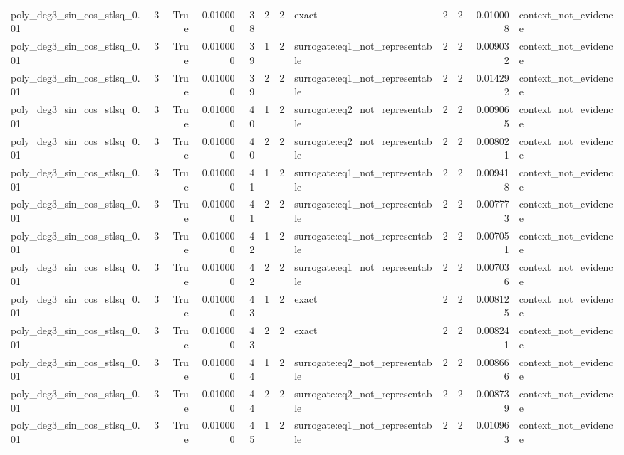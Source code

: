 \begin{tabular}{lrrrrrrlrrrl}
poly\_deg3\_sin\_cos\_stlsq\_0.01 & 3 & True & 0.010000 & 38 & 2 & 2 & exact & 2 & 2 & 0.010008 & context\_not\_evidence \\
poly\_deg3\_sin\_cos\_stlsq\_0.01 & 3 & True & 0.010000 & 39 & 1 & 2 & surrogate:eq1\_not\_representable & 2 & 2 & 0.009032 & context\_not\_evidence \\
poly\_deg3\_sin\_cos\_stlsq\_0.01 & 3 & True & 0.010000 & 39 & 2 & 2 & surrogate:eq1\_not\_representable & 2 & 2 & 0.014292 & context\_not\_evidence \\
poly\_deg3\_sin\_cos\_stlsq\_0.01 & 3 & True & 0.010000 & 40 & 1 & 2 & surrogate:eq2\_not\_representable & 2 & 2 & 0.009065 & context\_not\_evidence \\
poly\_deg3\_sin\_cos\_stlsq\_0.01 & 3 & True & 0.010000 & 40 & 2 & 2 & surrogate:eq2\_not\_representable & 2 & 2 & 0.008021 & context\_not\_evidence \\
poly\_deg3\_sin\_cos\_stlsq\_0.01 & 3 & True & 0.010000 & 41 & 1 & 2 & surrogate:eq1\_not\_representable & 2 & 2 & 0.009418 & context\_not\_evidence \\
poly\_deg3\_sin\_cos\_stlsq\_0.01 & 3 & True & 0.010000 & 41 & 2 & 2 & surrogate:eq1\_not\_representable & 2 & 2 & 0.007773 & context\_not\_evidence \\
poly\_deg3\_sin\_cos\_stlsq\_0.01 & 3 & True & 0.010000 & 42 & 1 & 2 & surrogate:eq1\_not\_representable & 2 & 2 & 0.007051 & context\_not\_evidence \\
poly\_deg3\_sin\_cos\_stlsq\_0.01 & 3 & True & 0.010000 & 42 & 2 & 2 & surrogate:eq1\_not\_representable & 2 & 2 & 0.007036 & context\_not\_evidence \\
poly\_deg3\_sin\_cos\_stlsq\_0.01 & 3 & True & 0.010000 & 43 & 1 & 2 & exact & 2 & 2 & 0.008125 & context\_not\_evidence \\
poly\_deg3\_sin\_cos\_stlsq\_0.01 & 3 & True & 0.010000 & 43 & 2 & 2 & exact & 2 & 2 & 0.008241 & context\_not\_evidence \\
poly\_deg3\_sin\_cos\_stlsq\_0.01 & 3 & True & 0.010000 & 44 & 1 & 2 & surrogate:eq2\_not\_representable & 2 & 2 & 0.008666 & context\_not\_evidence \\
poly\_deg3\_sin\_cos\_stlsq\_0.01 & 3 & True & 0.010000 & 44 & 2 & 2 & surrogate:eq2\_not\_representable & 2 & 2 & 0.008739 & context\_not\_evidence \\
poly\_deg3\_sin\_cos\_stlsq\_0.01 & 3 & True & 0.010000 & 45 & 1 & 2 & surrogate:eq1\_not\_representable & 2 & 2 & 0.010963 & context\_not\_evidence \\

\end{tabular}
